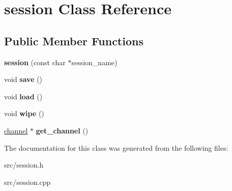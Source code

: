 \hypertarget{classsession}{}\section{session Class Reference}
\label{classsession}
\subsection*{Public Member Functions}
\begin{DoxyCompactItemize}
\item 
\mbox{\label{classsession_ac47d0baf384a8643d288b65b8a41403a}} 
{\bfseries session} (const char $\ast$session\+\_\+name)
\item 
\mbox{\label{classsession_a1cac142e82111a5560b8bd7f751d90cd}} 
void {\bfseries save} ()
\item 
\mbox{\label{classsession_a19927891dbba8c1e0af4246437cefd2b}} 
void {\bfseries load} ()
\item 
\mbox{\label{classsession_a9bf140b2437977c59f0e51662f7393ee}} 
void {\bfseries wipe} ()
\item 
\mbox{\label{classsession_a26a7e5d3911fa8b33660fe40d1d07dfc}} 
\mbox{\hyperlink{classchannel}{channel}} $\ast$ {\bfseries get\+\_\+channel} ()
\end{DoxyCompactItemize}


The documentation for this class was generated from the following files\+:\begin{DoxyCompactItemize}
\item 
src/session.\+h\item 
src/session.\+cpp\end{DoxyCompactItemize}
